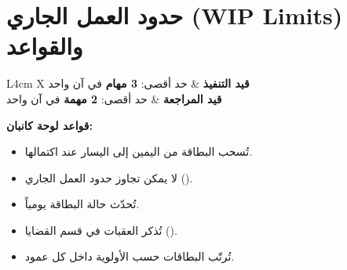 \documentclass[11pt,a4paper,landscape]{article}
\begin{document}
\section*{حدود العمل الجاري (WIP Limits) والقواعد}

\begin{tabularx}{\textwidth}{L{4cm} X}
\toprule
\textbf{قيد التنفيذ} & حد أقصى: \textbf{3 مهام} في آن واحد \\
\textbf{قيد المراجعة} & حد أقصى: \textbf{2 مهمة} في آن واحد \\
\bottomrule
\end{tabularx}

\vspace{1em}

\textbf{قواعد لوحة كانبان:}
\begin{itemize}
    \item تُسحب البطاقة من اليمين إلى اليسار عند اكتمالها.
    \item لا يمكن تجاوز حدود العمل الجاري ().
    \item تُحدّث حالة البطاقة يومياً.
    \item تُذكر العقبات في قسم القضايا ().
    \item تُرتّب البطاقات حسب الأولوية داخل كل عمود.
\end{itemize}
\end{document}
